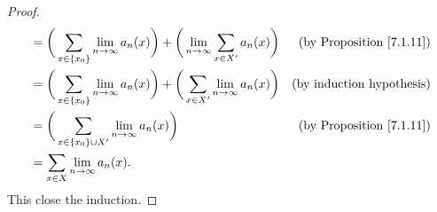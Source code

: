 \begin{proof}
\begin{align*}
                                                  & = \bigg(\sum_{x \in \{x_0\}} \lim_{n \to \infty} a_n(x)\bigg) + \bigg(\lim_{n \to \infty} \sum_{x \in X'} a_n(x)\bigg) & \text{(by Proposition \ref{7.1.11})} \\
                                                  & = \bigg(\sum_{x \in \{x_0\}} \lim_{n \to \infty} a_n(x)\bigg) + \bigg(\sum_{x \in X'} \lim_{n \to \infty} a_n(x)\bigg) & \text{(by induction hypothesis)}     \\
                                                  & = \bigg(\sum_{x \in \{x_0\} \cup X'} \lim_{n \to \infty} a_n(x)\bigg)                                                  & \text{(by Proposition \ref{7.1.11})} \\
                                                  & = \sum_{x \in X} \lim_{n \to \infty} a_n(x).
    \end{align*}
    This close the induction.
\end{proof}